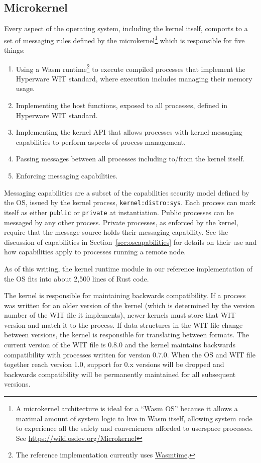 \documentclass[runningheads]{llncs}
\begin{document}
\subsection{Microkernel}
\label{sec:osmicrokernel}

Every aspect of the operating system, including the kernel itself, comports to a set of messaging rules defined by the microkernel\footnote{A microkernel architecture is ideal for a ``Wasm OS'' because it allows a maximal amount of system logic to live in Wasm itself, allowing system code to experience all the safety and conveniences afforded to userspace processes. See \url{https://wiki.osdev.org/Microkernel}} which is responsible for five things:
\begin{enumerate}
    \item Using a Wasm runtime\footnote{The reference implementation currently uses \href{https://wasmtime.dev}{Wasmtime}.}
    to execute compiled processes that implement the Hyperware WIT standard, where execution includes managing their memory usage.
    \item Implementing the host functions, exposed to all processes, defined in Hyperware WIT standard.
    \item Implementing the kernel API that allows processes with kernel-messaging capabilities to perform aspects of process management.
    \item Passing messages between all processes including to/from the kernel itself.
    \item Enforcing messaging capabilities.
\end{enumerate}

Messaging capabilities are a subset of the capabilities security model defined by the OS, issued by the kernel process, \verb|kernel:distro:sys|.
Each process can mark itself as either \verb|public| or \verb|private| at instantiation.
Public processes can be messaged by any other process.
Private processes, as enforced by the kernel, require that the message source holds their messaging capability.
See the discussion of capabilities in Section~\ref{sec:oscapabilities} for details on their use and how capabilities apply to processes running a remote node.

As of this writing, the kernel runtime module in our reference implementation of the OS fits into about 2,500 lines of Rust code.

The kernel is responsible for maintaining backwards compatibility.
If a process was written for an older version of the kernel (which is determined by the version number of the WIT file it implements), newer kernels must store that WIT version and match it to the process.
If data structures in the WIT file change between versions, the kernel is responsible for translating between formats.
The current version of the WIT file is 0.8.0 and the kernel maintains backwards compatibility with processes written for version 0.7.0.
When the OS and WIT file together reach version 1.0, support for 0.x versions will be dropped and backwards compatibility will be permanently maintained for all subsequent versions.
\end{document}
